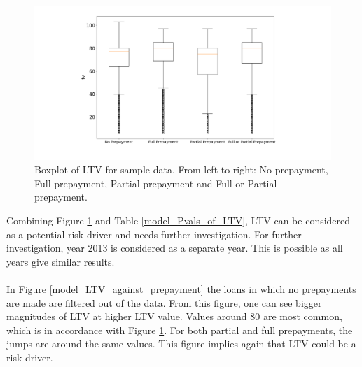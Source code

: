         \begin{figure}[H]
            \centering
            \includegraphics[width=\linewidth]{Figures/Boxplot_of_ltv_[2013, 2014, 2015, 2016, 2017, 2018, 2019, 2020]_.png}
            \caption{
                Boxplot of LTV for sample data.
                 From left to right: No prepayment, 
                 Full prepayment, Partial prepayment and Full or 
                 Partial prepayment.
                 }
            \label{model_boxplot_LTV}
        \end{figure}
        Combining Figure \ref{model_boxplot_LTV} and Table 
        \ref{model_Pvals_of_LTV}, LTV can be considered as a 
        potential risk driver and needs further investigation. For further investigation, year 2013 is considered 
        as a separate year. This is possible as all years give
        similar results.  
        \\\\
        In Figure \ref{model_LTV_against_prepayment} the loans in 
        which no prepayments are made are filtered out of the data.
        From this figure, one can see bigger magnitudes of LTV at higher LTV value. Values around 80 are most common, which
        is in accordance with Figure \ref{model_boxplot_LTV}. For both partial and full prepayments, the jumps are around the same values. This figure implies again that LTV could be a risk driver. 
